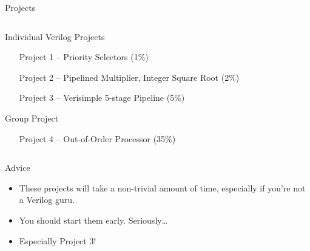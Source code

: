 \documentclass[table,dvipsnames,colorlinks=true]{beamer}
\begin{document}
\begin{frame}{Projects}
    \begin{columns}
        \begin{column}[c]{0.8\textwidth}
            \begin{block}{\hspace*{-32pt}Individual Verilog Projects}
            \begin{itemize}{\setlength\leftmargin{32pt}}
                    \item[Project 1 --] Priority Selectors (1\%)
                    \item[Project 2 --] Pipelined Multiplier, Integer Square Root (2\%)
                    \item[Project 3 --] Verisimple 5-stage Pipeline (5\%)
                \end{itemize}
            \end{block}
            \begin{block}{\hspace*{-32pt}Group Project}
                \begin{itemize}
                    \item[Project 4 --] Out-of-Order Processor (35\%)
                \end{itemize}
            \end{block}
        \end{column}
    \end{columns}
\end{frame}

\begin{frame}{Advice}
    \begin{itemize}
        \item These projects will take a non-trivial amount of time, especially
            if you're not a Verilog guru.
        \item You should start them early. Seriously\dots
        \item Especially Project 3!
    \end{itemize}
\end{frame}
\end{document}
